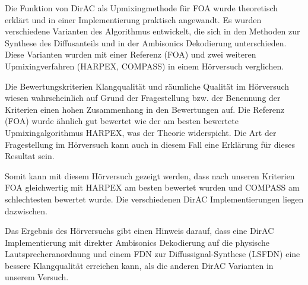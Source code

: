 Die Funktion von DirAC als Upmixingmethode für FOA wurde theoretisch erklärt und in einer Implementierung praktisch angewandt. Es wurden verschiedene Varianten des Algorithmus entwickelt, die sich in den Methoden zur Synthese des Diffusanteils und in der Ambisonics Dekodierung unterschieden. Diese Varianten wurden mit einer Referenz (FOA) und zwei weiteren Upmixingverfahren (HARPEX, COMPASS) in einem Hörversuch verglichen.

Die Bewertungskriterien Klangqualität und räumliche Qualität im Hörversuch wiesen wahrscheinlich auf Grund der Fragestellung bzw. der Benennung der Kriterien einen hohen Zusammenhang in den Bewertungen auf. Die Referenz (FOA) wurde ähnlich gut bewertet wie der am besten bewertete Upmixingalgorithmus HARPEX, was der Theorie widerspicht. Die Art der Fragestellung im Hörversuch kann auch in diesem Fall eine Erklärung für dieses Resultat sein.

Somit kann mit diesem Hörversuch gezeigt werden, dass nach unseren Kriterien FOA gleichwertig mit HARPEX am besten bewertet wurden und COMPASS am schlechtesten bewertet wurde. Die verschiedenen DirAC Implementierungen liegen dazwischen.

Das Ergebnis des Hörversuchs gibt einen Hinweis darauf, dass eine DirAC Implementierung mit direkter Ambisonics Dekodierung auf die physische Lautsprecheranordnung und einem FDN zur Diffussignal-Synthese (LSFDN) eine bessere Klangqualität erreichen kann, als die anderen DirAC Varianten in unserem Versuch.

